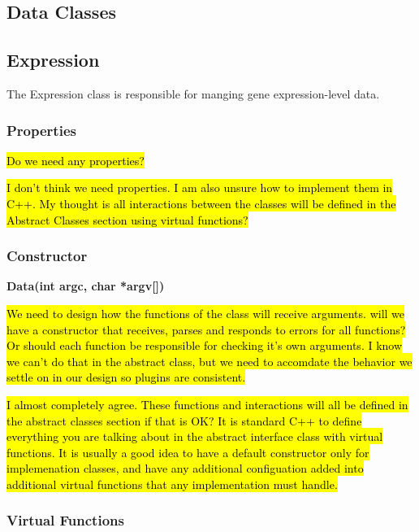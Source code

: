 \documentclass[10pt]{article}
\providecommand{\stephen}[1]{\sethlcolor{lyellow}\hl{#1}}
\providecommand{\josh}[1]{\sethlcolor{lblue}\hl{#1}}
\begin{document}
\begin{appendices}
\newpage
\section{Data Classes}

\subsection{Expression}

The Expression class is responsible for manging gene expression-level data.  

\subsubsection{Properties}

\stephen{Do we need any properties?}

\josh{I don't think we need properties. I am also unsure how to implement them 
in C++. My thought is all interactions between the classes will be defined in 
the Abstract Classes section using virtual functions?}

\subsubsection{Constructor}

{\bfseries Data(int argc, char *argv[])}

\stephen{We need to design how the functions of the class will receive 
arguments.  will we have a constructor that receives, parses and responds to 
errors for all functions?  Or should each function be responsible for checking 
it's own arguments. I know we can't do that in the abstract class, but 
we need to accomdate the behavior we settle on in our design so plugins
are consistent.}

\josh{I almost completely agree. These functions and interactions will all be 
defined in the abstract classes section if that is OK? It is standard C++ to 
define everything you are talking about in the abstract interface class with 
virtual functions. It is usually a good idea to have a default constructor only 
for implemenation classes, and have any additional configuation added into 
additional virtual functions that any implementation must handle.}

\subsubsection{Virtual Functions}


\end{appendices}
\end{document}
